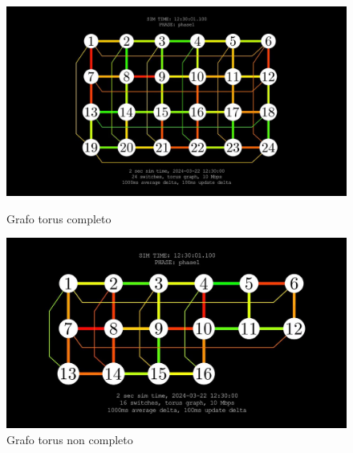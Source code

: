 \documentclass[binding=0.6cm]{sapthesis}
\begin{document}
\begin{figure}[h]
    \centering
    \begin{minipage}{0.48\textwidth}
      \includegraphics[width=\linewidth]{immagini/torus_full_24.JPG}
      \caption{Grafo torus completo}
      \label{fig:torus_full_24}
    \end{minipage}\hfill
    \begin{minipage}{0.48\textwidth}
      \includegraphics[width=\linewidth]{immagini/torus_not_full_adaptive.JPG}
      \caption{Grafo torus non completo}
      \label{fig:torus_not_full_adaptive}
    \end{minipage}
\end{figure}
\end{document}
